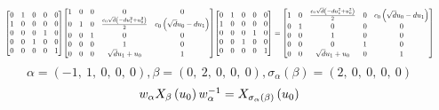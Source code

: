 \documentclass[11pt]{article}
\theoremstyle{definition}
\begin{document}
\[
\scaletoalign{\textwidth}{{\left[\begin{matrix}0 & 1 & 0 & 0 & 0\\1 & 0 & 0 & 0 & 0\\0 & 0 & 0 & 1 & 0\\0 & 0 & 1 & 0 & 0\\0 & 0 & 0 & 0 & 1\end{matrix}\right]} {\left[\begin{matrix}1 & 0 & 0 & 0 & 0\\0 & 1 & 0 & \frac{c_{0} \sqrt{d} \left(- d u_{1}^{2} + u_{0}^{2}\right)}{2} & c_{0} \left(\sqrt{d} u_{0} - d u_{1}\right)\\0 & 0 & 1 & 0 & 0\\0 & 0 & 0 & 1 & 0\\0 & 0 & 0 & \sqrt{d} u_{1} + u_{0} & 1\end{matrix}\right]} {\left[\begin{matrix}0 & 1 & 0 & 0 & 0\\1 & 0 & 0 & 0 & 0\\0 & 0 & 0 & 1 & 0\\0 & 0 & 1 & 0 & 0\\0 & 0 & 0 & 0 & 1\end{matrix}\right]} = {\left[\begin{matrix}1 & 0 & \frac{c_{0} \sqrt{d} \left(- d u_{1}^{2} + u_{0}^{2}\right)}{2} & 0 & c_{0} \left(\sqrt{d} u_{0} - d u_{1}\right)\\0 & 1 & 0 & 0 & 0\\0 & 0 & 1 & 0 & 0\\0 & 0 & 0 & 1 & 0\\0 & 0 & \sqrt{d} u_{1} + u_{0} & 0 & 1\end{matrix}\right]}}
\]
\[
\alpha = \left( -1, \  1, \  0, \  0, \  0\right), \beta = \left( 0, \  2, \  0, \  0, \  0\right), \sigma_{\alpha}(\beta) = \left( 2, \  0, \  0, \  0, \  0\right)
\]
\[
\scaletoalign{\textwidth}{w_{\alpha} X_{\beta}\left(u_{0}\right) w_{\alpha}^{-1} = X_{\sigma_{\alpha}\left(\beta\right)}\left(u_{0}\right)}
\]
\end{document}
